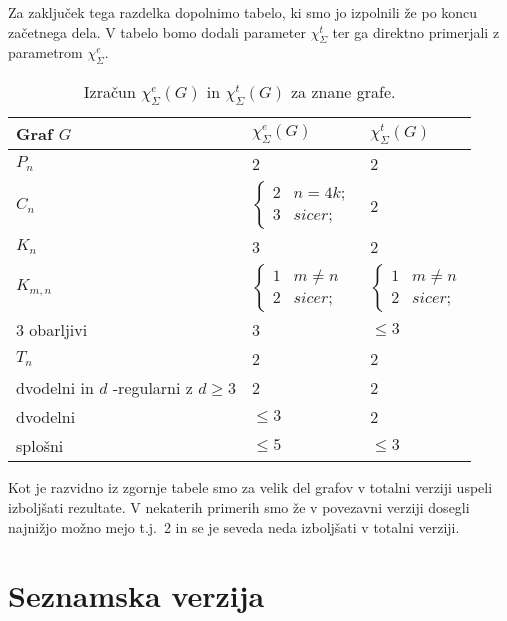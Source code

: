 \documentclass[12pt,a4paper,twoside]{article}
\theoremstyle{definition} %
\theoremstyle{plain} %
\newcommand{\ec}{\chi_{\Sigma}^e}
\newcommand{\ect}{\chi_{\Sigma}^t}
\numberwithin{equation}{section}  %
\begin{document}
Za zaključek tega razdelka dopolnimo tabelo, ki smo jo izpolnili že po koncu začetnega dela. V tabelo bomo dodali parameter $\ect$ ter ga direktno primerjali z parametrom $\ec$.
\begin{table}[H]
\caption{\label{tab:tab2} Izračun $\ec(G)$ in $\ect(G)$ za znane grafe. }
\centering
\begin{tabular}{|l|l|l|}
\hline
 Graf $G$ & $\ec(G)$ & $\ect(G) $ \\ \hline
 $P_n$ & 2 & 2 \\ \hline
 $C_n$ & $\begin{cases}
	2 & n = 4k;\\ 
	3 & sicer;
	\end{cases}$ & 2 \\ \hline
 $K_n$& 3 & 2 \\ \hline
 $K_{m,n}$& $\begin{cases}
	1 & m \neq n\\ 
	2 & sicer;
	\end{cases}$ &$\begin{cases}
	1 & m \neq n\\ 
	2 & sicer;
	\end{cases}$ \\ \hline
 3 obarljivi& 3 & $\le 3$ \\ \hline
$T_n$ & 2 & 2\\ \hline
dvodelni in $d$ -regularni z $d \ge 3 $ & 2  & 2\\ \hline
dvodelni   & $\le 3$  & 2\\ \hline
splošni   & $\le 5$  &$ \le 3$\\ \hline
\end{tabular}
\end{table}
Kot je razvidno iz zgornje tabele smo za velik del grafov v totalni verziji uspeli izboljšati rezultate. V nekaterih primerih smo že v povezavni verziji dosegli najnižjo možno mejo t.j.\ 2 in se je seveda neda izboljšati v totalni verziji.


\section{Seznamska verzija} 
\end{document}
